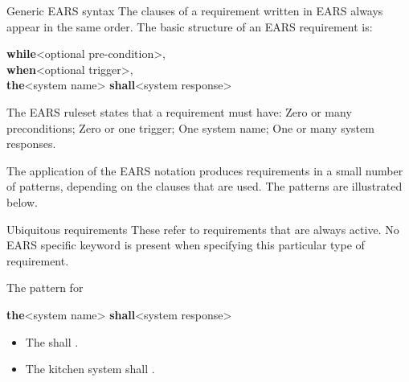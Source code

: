 \documentclass[aspectratio=169]{beamer}
\begin{document}
\begin{frame}[fragile]



\newcommand{\mkw}[2]{\textcolor{#2}{\textbf{#1}}\xspace}
\newcommand{\ewhile}{\mkw{while}{pink!75!black}}
\newcommand{\ewhere}{\mkw{where}{pink!75!black}}
\newcommand{\eif}{\mkw{if}{pink!75!black}}
\newcommand{\ethen}{\mkw{then}{pink!75!black}}
\newcommand{\ewhen}{\mkw{when}{blue!75!black}}
\newcommand{\ethe}{\mkw{the}{purple!75!black}}
\newcommand{\eshall}{\mkw{shall}{red!75!black}}

\begin{slide}{Generic EARS syntax}
    The clauses of a requirement written in EARS always appear in the same order. The basic structure of an EARS requirement is:

    \begin{block}{}\ttfamily
    \ewhile <optional pre-condition>, \\
     \ewhen <optional trigger>, \\
      \ethe <system name> \eshall <system response> 
    \end{block}

  The EARS ruleset states that a requirement must have: Zero or many preconditions; Zero or one trigger; One system name; One or many system responses.

The application of the EARS notation produces requirements in a small number of patterns, depending on the clauses that are used. The patterns are illustrated below.
\end{slide}

\begin{slide}{Ubiquitous requirements}
    These refer to requirements that are always active. No EARS specific keyword is present when specifying this particular type of requirement.
    
    The pattern for 
    \begin{block}{}
    \ethe <system name> \eshall <system response>  
    \end{block}
  \begin{example}
    \begin{itemize}
      \item The {\color{red}{mobile phone}} shall {\color{blue}{have a mass of less than $x$ grams}}.
      \item The {\color{red}kitchen system} shall {\color{blue}{have an input hatch}}.
    \end{itemize}
  \end{example}
\end{slide}



\end{frame}
\end{document}
